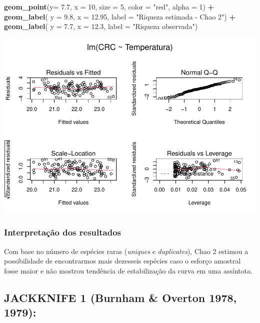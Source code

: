 \documentclass[
]{book}
\newenvironment{Shaded}{\begin{snugshade}}{\end{snugshade}}
\newcommand{\DataTypeTok}[1]{\textcolor[rgb]{0.13,0.29,0.53}{#1}}
\newcommand{\DecValTok}[1]{\textcolor[rgb]{0.00,0.00,0.81}{#1}}
\newcommand{\FloatTok}[1]{\textcolor[rgb]{0.00,0.00,0.81}{#1}}
\newcommand{\KeywordTok}[1]{\textcolor[rgb]{0.13,0.29,0.53}{\textbf{#1}}}
\newcommand{\NormalTok}[1]{#1}
\newcommand{\OperatorTok}[1]{\textcolor[rgb]{0.81,0.36,0.00}{\textbf{#1}}}
\newcommand{\StringTok}[1]{\textcolor[rgb]{0.31,0.60,0.02}{#1}}
\begin{document}
\begin{Shaded}
\begin{Highlighting}[]
\StringTok{  }\KeywordTok{geom_point}\NormalTok{(}\DataTypeTok{y=} \FloatTok{7.7}\NormalTok{, }\DataTypeTok{x =} \DecValTok{10}\NormalTok{, }\DataTypeTok{size =} \DecValTok{5}\NormalTok{, }\DataTypeTok{color =} \StringTok{"red"}\NormalTok{, }\DataTypeTok{alpha =} \DecValTok{1}\NormalTok{) }\OperatorTok{+}\StringTok{ }
\StringTok{  }\KeywordTok{geom_label}\NormalTok{( }\DataTypeTok{y =} \FloatTok{9.8}\NormalTok{, }\DataTypeTok{x =} \FloatTok{12.95}\NormalTok{, }\DataTypeTok{label =} \StringTok{"Riqueza estimada - Chao 2"}\NormalTok{) }\OperatorTok{+}
\StringTok{  }\KeywordTok{geom_label}\NormalTok{( }\DataTypeTok{y =} \FloatTok{7.7}\NormalTok{, }\DataTypeTok{x =} \FloatTok{12.3}\NormalTok{, }\DataTypeTok{label =} \StringTok{"Riqueza observada"}\NormalTok{)}
\end{Highlighting}
\end{Shaded}

\includegraphics{livro_r_ecologia_files/figure-latex/unnamed-chunk-9-1.pdf}

\hypertarget{interpretauxe7uxe3o-dos-resultados-4}{%
\subsubsection{Interpretação dos resultados}\label{interpretauxe7uxe3o-dos-resultados-4}}

Com base no número de espécies raras (\emph{uniques} e \emph{duplicates}), Chao 2 estimou a possibilidade de encontrarmos mais dezesseis espécies caso o esforço amostral fosse maior e não mostrou tendência de estabilização da curva em uma assíntota.

\hypertarget{jackknife-1-burnham-overton-1978-1979}{%
\subsection{JACKKNIFE 1 (Burnham \& Overton 1978, 1979):}\label{jackknife-1-burnham-overton-1978-1979}}
\end{document}
